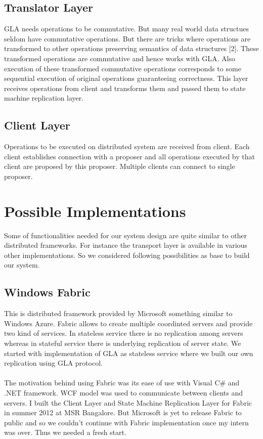 \documentclass[a4paper,12pt]{report}
\begin{document}
\subsection{Translator Layer}
GLA needs operations to be commutative. But many real world data structues seldom have commutative operations. But there are tricks where operations are transformed to other operations preserving semantics of data structures [2]. These transformed operations are commutative and hence works with GLA. Also execution of these transformed commutative operations corresponds to some sequential execution of original operations guaranteeing correctness. This layer receives operations from client and transforms them and passed them to state machine replication layer.
\subsection{Client Layer} Operations to be executed on distributed system are received from client. Each client establishes connection with a proposer and all operations executed by that client are proposed by this proposer. Multiple clients can connect to single proposer.

\section{Possible Implementations}
Some of functionalities needed for our system design are quite similar to other distributed frameworks. For instance the transport layer is available in various other implementations. So we considered following possibilities as base to build our system.

\subsection{Windows Fabric} This is distributed framework provided by Microsoft something similar to Windows Azure. Fabric allows to create multiple coordinted servers and provide two kind of services. In stateless service there is no replication among servers whereas in stateful service there is underlying replication of server state. We started with implementation of GLA as stateless service where we built our own replication using GLA protocol. 
\paragraph{} 
The motivation behind using Fabric was its ease of use with Visual C\# and .NET framework. WCF model was used to communicate between clients and servers. I built the Client Layer and State Machine Replication Layer for Fabric in summer 2012 at MSR Bangalore. But Microsoft is yet to release Fabric to public and so we couldn't continue with Fabric implementation once my intern was over. Thus we needed a fresh start.
\end{document}
